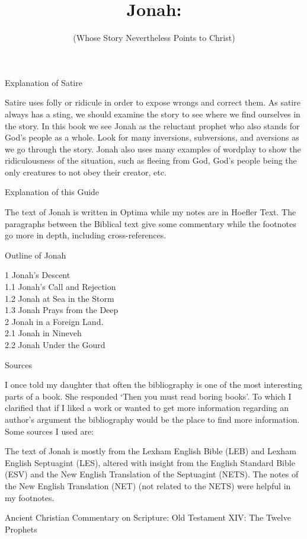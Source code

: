 \documentclass[
]{article}
\title{Jonah:}
\subtitle{(Whose Story Nevertheless Points to Christ)}
\author{}
\date{}
\begin{document}
\maketitle

Explanation of Satire

Satire uses folly or ridicule in order to expose wrongs and correct
them. As satire always has a sting, we should examine the story to see
where we find ourselves in the story. In this book we see Jonah as the
reluctant prophet who also stands for God's people as a whole. Look for
many inversions, subversions, and aversions as we go through the story.
Jonah also uses many examples of wordplay to show the ridiculousness of
the situation, such as fleeing from God, God's people being the only
creatures to not obey their creator, etc.

Explanation of this Guide

The text of Jonah is written in Optima while my notes are in Hoefler
Text. The paragraphs between the Biblical text give some commentary
while the footnotes go more in depth, including cross-references.

Outline of Jonah

1 Jonah's Descent\\
1.1 Jonah's Call and Rejection\\
1.2 Jonah at Sea in the Storm\\
1.3 Jonah Prays from the Deep\\
2 Jonah in a Foreign Land.\\
2.1 Jonah in Nineveh\\
2.2 Jonah Under the Gourd

Sources

I once told my daughter that often the bibliography is one of the most
interesting parts of a book. She responded `Then you must read boring
books'. To which I clarified that if I liked a work or wanted to get
more information regarding an author's argument the bibliography would
be the place to find more information. Some sources I used are:

The text of Jonah is mostly from the Lexham English Bible (LEB) and
Lexham English Septuagint (LES), altered with insight from the English
Standard Bible (ESV) and the New English Translation of the Septuagint
(NETS). The notes of the New English Translation (NET) (not related to
the NETS) were helpful in my footnotes.

Ancient Christian Commentary on Scripture: Old Testament XIV: The Twelve
Prophets
\end{document}
